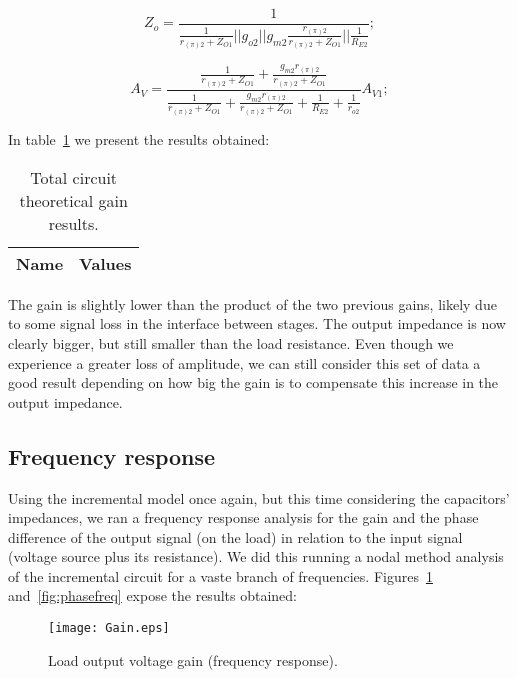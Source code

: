 \begin{equation}
  Z_o=\frac{1}{\frac{1}{r_{(\pi)2}+Z_{O1}}||g_{o2}||g_{m2}\frac{r_{(\pi)2}}{r_{(\pi)2}+Z_{O1}}||\frac{1}{R_{E2}}};
\end{equation}

\begin{equation}
  A_V=\frac{\frac{1}{r_{(\pi)2}+Z_{O1}}+\frac{g_{m2}r_{(\pi)2}}{r_{(\pi)2}+Z_{O1}}}{\frac{1}{r_{(\pi)2}+Z_{O1}}+\frac{g_{m2}r_{(\pi)2}}{r_{(\pi)2}+Z_{O1}}+\frac{1}{R_{E2}}+\frac{1}{r_{o2}}}A_{V1};
\end{equation}

In table~\ref{tab:outputt} we present the results obtained:

\begin{table}[h]
  \centering
  \begin{tabular}{|l|r|}
    \hline    
    {\bf Name} & {\bf Values} \\ \hline
     
  \end{tabular}
  \caption{Total circuit theoretical gain results.}
  \label{tab:outputt}
\end{table}

The gain is slightly lower than the product of the two previous gains, likely due to some signal loss in the interface between stages. The output impedance is now clearly bigger, but still smaller than the load resistance. Even though we experience a greater loss of amplitude, we can still consider this set of data a good result depending on how big the gain is to compensate this increase in the output impedance.

\subsection{Frequency response}
Using the incremental model once again, but this time considering the capacitors' impedances, we ran a frequency response analysis for the gain and the phase difference of the output signal (on the load) in relation to the input signal (voltage source plus its resistance). We did this running a nodal method analysis of the incremental circuit for a vaste branch of frequencies. Figures~\ref{fig:gainfreq} and~\ref{fig:phasefreq} expose the results obtained:

\begin{figure}[!h] \centering
\texttt{[image: Gain.eps]}
\caption{Load output voltage gain (frequency response).}
\label{fig:gainfreq}
\end{figure}

